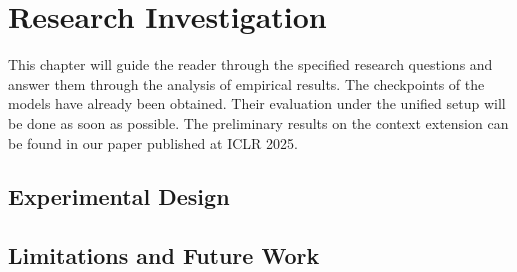 \chapter{Research Investigation}\label{chap:research-investigation}  %

This chapter will guide the reader through the specified research questions and answer them through the analysis of empirical results. The checkpoints of the models have already been obtained. Their evaluation under the unified setup will be done as soon as possible. The preliminary results on the context extension can be found in our paper \parencite{sapronov2025} published at ICLR 2025.


\section{Experimental Design}

\section{Limitations and Future Work}

